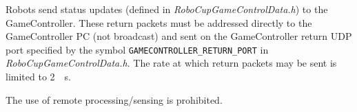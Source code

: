 Robots send status updates (defined in \emph{RoboCupGameControlData.h}) to the GameController.
These return packets must be addressed directly to the GameController PC (\ie not broadcast) and sent on the GameController return UDP port specified by the symbol \verb!GAMECONTROLLER_RETURN_PORT! in \emph{RoboCupGameControlData.h}.
The rate at which return packets may be sent is limited to \qty{2}{\per\second}.

The use of remote processing/sensing is prohibited.

